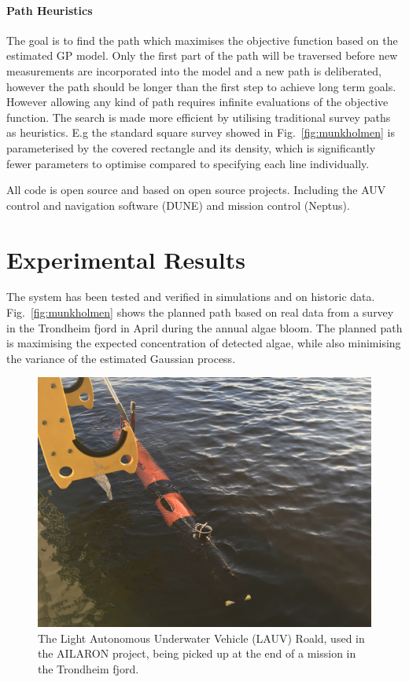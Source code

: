 \documentclass[conference]{IEEEtran}
\begin{document}
\paragraph{Path Heuristics}
The goal is to find the path which maximises the objective function based on the estimated GP model.
Only the first part of the path will be traversed before new measurements are incorporated into the model and a new path is deliberated, however the path should be longer than the first step to achieve long term goals.
However allowing any kind of path requires infinite evaluations of the objective function.
The search is made more efficient by utilising traditional survey paths as heuristics. E.g the standard square survey showed in Fig.~\ref{fig:munkholmen} is parameterised by the covered rectangle and its density, which is significantly fewer parameters to optimise compared to specifying each line individually. 

All code is open source and based on open source projects. Including the AUV control and navigation software (DUNE) and mission control (Neptus). 

\section{Experimental Results}
The system has been tested and verified in simulations and on historic data. Fig.~\ref{fig:munkholmen} shows the planned path based on real data from a survey in the Trondheim fjord in April during the annual algae bloom. The planned path is maximising the expected concentration of detected algae, while also minimising the variance of the estimated Gaussian process.
\begin{figure}[tbp]
\centerline{\includegraphics[width=\linewidth]{figures/Roald.jpeg}}
\caption{The Light Autonomous Underwater Vehicle (LAUV) Roald, used in the AILARON project, being picked up at the end of a mission in the Trondheim fjord.}
\label{fig:roald}
\end{figure}
\end{document}
